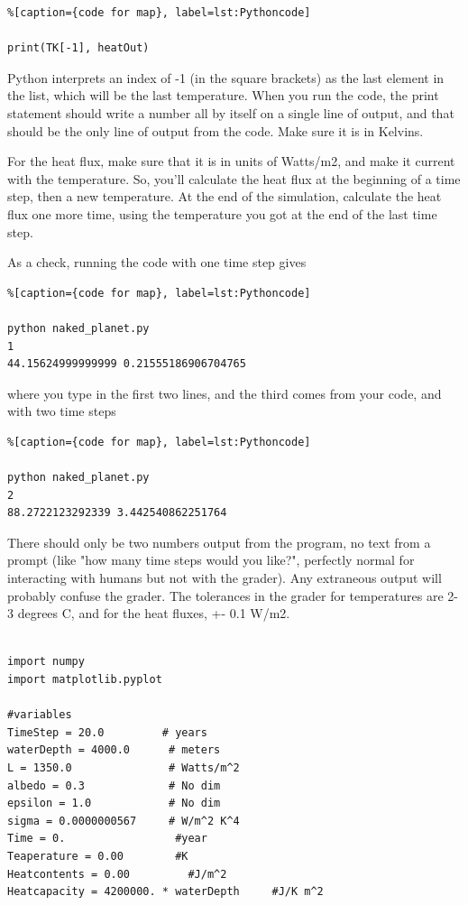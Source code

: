 {\begin{lstlisting}%[caption={code for map}, label=lst:Pythoncode]

print(TK[-1], heatOut)
\end{lstlisting}

Python interprets an index of -1 (in the square brackets) as the last element in the list, which will be the last temperature. When you run the code, the print statement should write a number all by itself on a single line of output, and that should be the only line of output from the code. Make sure it is in Kelvins.

For the heat flux, make sure that it is in units of Watts/m2, and make it current with the temperature. So, you'll calculate the heat flux at the beginning of a time step, then a new temperature. At the end of the simulation, calculate the heat flux one more time, using the temperature you got at the end of the last time step.

As a check, running the code with one time step gives

\begin{lstlisting}%[caption={code for map}, label=lst:Pythoncode]

python naked_planet.py
1
44.15624999999999 0.21555186906704765  
\end{lstlisting}

where you type in the first two lines, and the third comes from your code, and with two time steps

\begin{lstlisting}%[caption={code for map}, label=lst:Pythoncode]

python naked_planet.py
2
88.2722123292339 3.442540862251764     
\end{lstlisting}

There should only be two numbers output from the program, no text from a prompt (like "how many time steps would you like?", perfectly normal for interacting with humans but not with the grader). Any extraneous output will probably confuse the grader. The tolerances in the grader for temperatures are 2-3 degrees C, and for the heat fluxes, +- 0.1 W/m2.

\begin{code}[흑체 복사평형 온도]
	\begin{lstlisting}
	
import numpy
import matplotlib.pyplot

#variables
TimeStep = 20.0         # years
waterDepth = 4000.0      # meters
L = 1350.0               # Watts/m^2
albedo = 0.3             # No dim
epsilon = 1.0            # No dim
sigma = 0.0000000567     # W/m^2 K^4
Time = 0.                 #year
Teaperature = 0.00        #K
Heatcontents = 0.00         #J/m^2
Heatcapacity = 4200000. * waterDepth     #J/K m^2


\end{lstlisting}
\end{code}}
